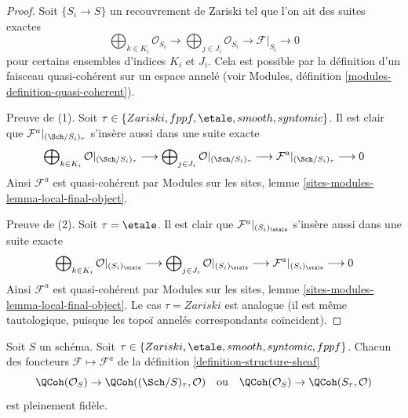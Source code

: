\begin{proof}
Soit $\{S_i \to S\}$ un recouvrement de Zariski tel que l'on ait des
suites exactes
$$
\bigoplus\nolimits_{k \in K_i} \mathcal{O}_{S_i} \longrightarrow
\bigoplus\nolimits_{j \in J_i} \mathcal{O}_{S_i} \longrightarrow
\mathcal{F}|_{S_i} \longrightarrow 0
$$
pour certains ensembles d'indices $K_i$ et $J_i$. Cela est possible par
la définition d'un faisceau quasi-cohérent sur un espace annelé
(voir Modules, définition \ref{modules-definition-quasi-coherent}).

\medskip\noindent
Preuve de (1). Soit $\tau \in \{Zariski, \linebreak[0] fppf, \linebreak[0]
\etale, \linebreak[0] smooth, \linebreak[0] syntomic\}$.
Il est clair que $\mathcal{F}^a|_{(\Sch/S_i)_\tau}$ s'insère aussi dans
une suite exacte
$$
\bigoplus\nolimits_{k \in K_i} \mathcal{O}|_{(\Sch/S_i)_\tau}
\longrightarrow
\bigoplus\nolimits_{j \in J_i} \mathcal{O}|_{(\Sch/S_i)_\tau}
\longrightarrow
\mathcal{F}^a|_{(\Sch/S_i)_\tau} \longrightarrow 0
$$
Ainsi $\mathcal{F}^a$ est quasi-cohérent par Modules sur les sites,
lemme \ref{sites-modules-lemma-local-final-object}.

\medskip\noindent
Preuve de (2). Soit $\tau = \etale$. Il est clair que
$\mathcal{F}^a|_{(S_i)_\etale}$ s'insère aussi dans une suite exacte
$$
\bigoplus\nolimits_{k \in K_i} \mathcal{O}|_{(S_i)_\etale}
\longrightarrow
\bigoplus\nolimits_{j \in J_i} \mathcal{O}|_{(S_i)_\etale}
\longrightarrow
\mathcal{F}^a|_{(S_i)_\etale} \longrightarrow 0
$$
Ainsi $\mathcal{F}^a$ est quasi-cohérent par Modules sur les sites,
lemme \ref{sites-modules-lemma-local-final-object}.
Le cas $\tau = Zariski$ est analogue (il est même tautologique, puisque
les topoï annelés correspondants coïncident).
\end{proof}

\begin{lemma}
\label{lemma-fully-faithful-associated}
Soit $S$ un schéma.
Soit $\tau \in \{Zariski, \linebreak[0] \etale, \linebreak[0]
smooth, \linebreak[0] syntomic, \linebreak[0] fppf\}$.
Chacun des foncteurs $\mathcal{F} \mapsto \mathcal{F}^a$ de la
définition \ref{definition-structure-sheaf}
$$
\QCoh(\mathcal{O}_S) \to \QCoh((\Sch/S)_\tau, \mathcal{O})
\quad\text{ou}\quad
\QCoh(\mathcal{O}_S) \to \QCoh(S_\tau, \mathcal{O})
$$
est pleinement fidèle.
\end{lemma}

